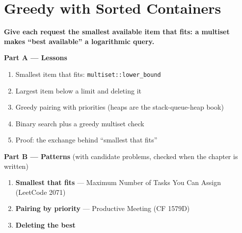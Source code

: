 \chapter{Greedy with Sorted Containers}
\label{ch:containers}

\begin{tcolorbox}[enhanced, colback=white, colframe=secondaryblue, boxrule=1pt, arc=2mm]
\textbf{\large\textcolor{primaryblue}{Give each request the smallest available item that fits: a multiset makes ``best available'' a logarithmic query.}}
\end{tcolorbox}


\begin{plannedbox}
\textbf{Part A --- Lessons}
\begin{enumerate}[leftmargin=*, label=\textbf{A\arabic*.}, itemsep=1pt]
    \item Smallest item that fits: \texttt{multiset::lower\_bound}
    \item Largest item below a limit and deleting it
    \item Greedy pairing with priorities (heaps are the stack-queue-heap book)
    \item Binary search plus a greedy multiset check
    \item Proof: the exchange behind ``smallest that fits''
\end{enumerate}
\textbf{Part B --- Patterns} (with candidate problems, checked when the chapter is written)
\begin{enumerate}[leftmargin=*, label=\textbf{P\arabic*.}, itemsep=1pt]
    \item \textbf{Smallest that fits} --- Maximum Number of Tasks You Can Assign {\small\color{darkgray}(LeetCode 2071)}
    \item \textbf{Pairing by priority} --- Productive Meeting {\small\color{darkgray}(CF 1579D)}
    \item \textbf{Deleting the best}
\end{enumerate}
\end{plannedbox}
